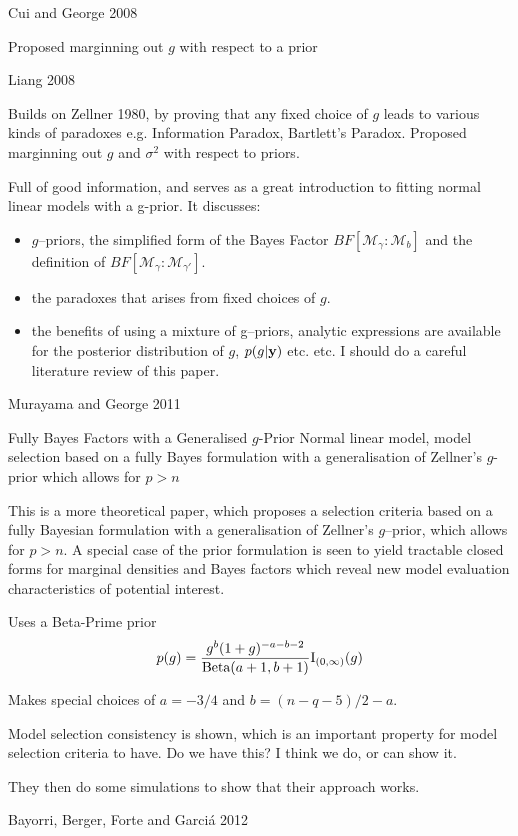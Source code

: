 \documentclass{amsart}[12pt]
\begin{document}
Cui and George 2008

Proposed marginning out $g$ with respect to a prior

Liang 2008

Builds on Zellner 1980, by proving that any fixed choice of $g$ leads to various kinds of paradoxes e.g.
Information Paradox, Bartlett's Paradox.
Proposed marginning out $g$ and $\sigma^2$ with respect to priors.

Full of good information, and serves as a great introduction to fitting normal linear models with a g-prior.
It discusses:
\begin{itemize}
\item $g$--priors, the simplified form of the Bayes Factor $BF[\mathcal{M}_\gamma : \mathcal{M}_b]$ and the definition of $BF[\mathcal{M}_\gamma : \mathcal{M}_{\gamma'}]$.
\item the paradoxes that arises from fixed choices of $g$.
\item the benefits of using a mixture of g--priors, analytic expressions are available for the posterior
distribution of $g$, $p(g|{\bf y})$ etc. etc. I should do a careful literature review of this paper.
\end{itemize}

Murayama and George 2011

Fully Bayes Factors with a Generalised $g$-Prior
Normal linear model, model selection based on a fully Bayes formulation with a generalisation of Zellner's
$g$-prior which allows for $p > n$

This is a more theoretical paper, which proposes a selection criteria based on a fully Bayesian formulation
with a generalisation of Zellner's $g$--prior, which allows for $p > n$. A special case of the prior
formulation is seen to yield tractable closed forms for marginal densities and Bayes factors which reveal new
model evaluation characteristics of potential interest.

Uses a Beta-Prime prior
\[
p(g) = \frac{g^b (1 + g)^{-a-b-2}}{\text{Beta}(a + 1, b + 1)} \text{I}_{(0, \infty)}(g)
\]

Makes special choices of $a = -3/4$ and $b = (n - q - 5)/2 - a$.

Model selection consistency is shown, which is an important property for model selection criteria to have. Do
we have this? I think we do, or can show it.

They then do some simulations to show that their approach works.

Bayorri, Berger, Forte and Garci\'{a} 2012
\end{document}
